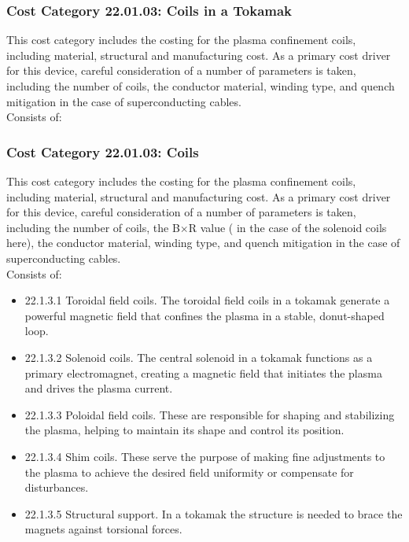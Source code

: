 \subsubsection*{Cost Category 22.01.03: Coils in a Tokamak}

This cost category includes the costing for the plasma confinement coils, including  material, structural and manufacturing cost. As a primary cost driver for this device, careful consideration of a number of parameters is taken, including the number of coils, the conductor material, winding type, and quench mitigation in the case of superconducting cables.\\

Consists of:


   

\subsubsection*{Cost Category 22.01.03: Coils}

This cost category includes the costing for the plasma confinement coils, including  material, structural and manufacturing cost. As a primary cost driver for this device, careful consideration of a number of parameters is taken, including the number of coils, the B$\times$R value ( in the case of the solenoid coils here), the conductor material, winding type, and quench mitigation in the case of superconducting cables.\\

Consists of:

\begin{itemize}
    \item 22.1.3.1 Toroidal field coils. The toroidal field coils in a tokamak generate a powerful magnetic field that confines the plasma in a stable, donut-shaped loop.
    \item 22.1.3.2 Solenoid coils. The central solenoid in a tokamak functions as a primary electromagnet, creating a magnetic field that initiates the plasma and drives the plasma current.
    \item 22.1.3.3 Poloidal field coils. These are responsible for shaping and stabilizing the plasma, helping to maintain its shape and control its position.
    \item 22.1.3.4 Shim coils. These serve the purpose of making fine adjustments to the plasma to achieve the desired field uniformity or compensate for disturbances.
    \item 22.1.3.5 Structural support. In a tokamak the structure is needed to brace the magnets against torsional forces.
\end{itemize}
   

